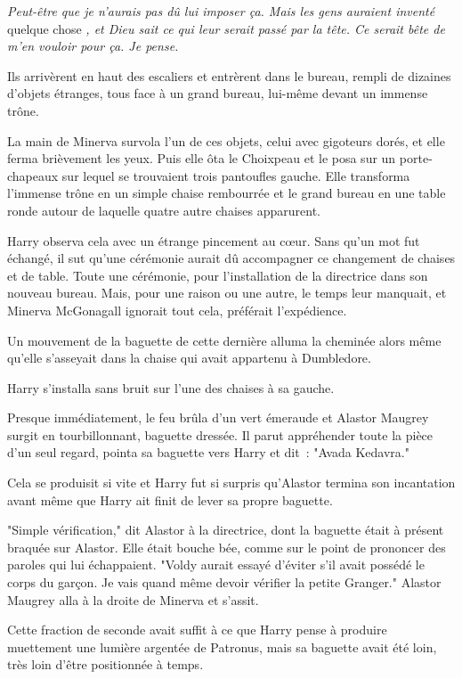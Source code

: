 \emph{Peut-être que je n'aurais pas dû lui imposer ça. Mais les gens auraient inventé} quelque chose \emph{, et Dieu sait ce qui leur serait passé par la tête. Ce serait bête de m'en vouloir pour ça. Je pense.}

Ils arrivèrent en haut des escaliers et entrèrent dans le bureau, rempli de dizaines d'objets étranges, tous face à un grand bureau, lui-même devant un immense trône.

La main de Minerva survola l'un de ces objets, celui avec gigoteurs dorés, et elle ferma brièvement les yeux. Puis elle ôta le Choixpeau et le posa sur un porte-chapeaux sur lequel se trouvaient trois pantoufles gauche. Elle transforma l'immense trône en un simple chaise rembourrée et le grand bureau en une table ronde autour de laquelle quatre autre chaises apparurent.

Harry observa cela avec un étrange pincement au cœur. Sans qu'un mot fut échangé, il sut qu'une cérémonie aurait dû accompagner ce changement de chaises et de table. Toute une cérémonie, pour l'installation de la directrice dans son nouveau bureau. Mais, pour une raison ou une autre, le temps leur manquait, et Minerva McGonagall ignorait tout cela, préférait l'expédience.

Un mouvement de la baguette de cette dernière alluma la cheminée alors même qu'elle s'asseyait dans la chaise qui avait appartenu à Dumbledore.

Harry s'installa sans bruit sur l'une des chaises à sa gauche.

Presque immédiatement, le feu brûla d'un vert émeraude et Alastor Maugrey surgit en tourbillonnant, baguette dressée. Il parut appréhender toute la pièce d'un seul regard, pointa sa baguette vers Harry et dit~: "Avada Kedavra."

Cela se produisit si vite et Harry fut si surpris qu'Alastor termina son incantation avant même que Harry ait finit de lever sa propre baguette.

"Simple vérification," dit Alastor à la directrice, dont la baguette était à présent braquée sur Alastor. Elle était bouche bée, comme sur le point de prononcer des paroles qui lui échappaient. "Voldy aurait essayé d'éviter s'il avait possédé le corps du garçon. Je vais quand même devoir vérifier la petite Granger." Alastor Maugrey alla à la droite de Minerva et s'assit.

Cette fraction de seconde avait suffit à ce que Harry pense à produire muettement une lumière argentée de Patronus, mais sa baguette avait été loin, très loin d'être positionnée à temps.

